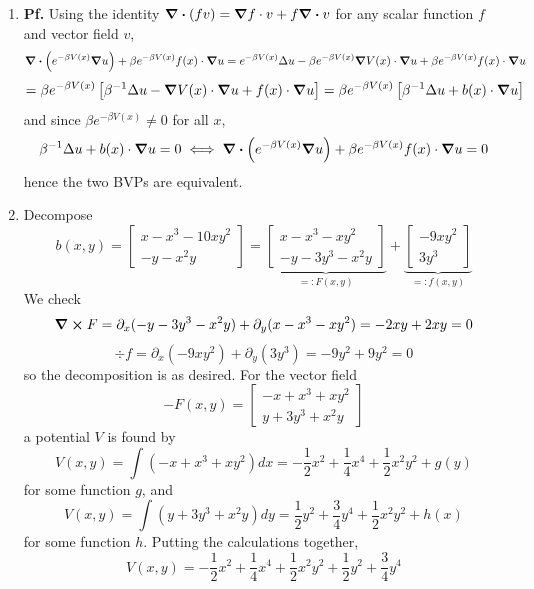 \documentclass{article}
\def\tbf#1{\textbf{#1}}
\newcommand{\sbr}[1]{\left[#1\right]}
\newcommand{\m}[2][b]{\begin{#1matrix}#2\end{#1matrix}}
\newcommand{\inv}{^{-1}}
\newcommand{\pf}{\tbf{Pf. }}
\newcommand{\ptl}{\partial}
\begin{document}
\begin{enumerate}[label=(\alph*)]
	
\item \pf Using the identity $\div(fv)=\grad f\cdot v+f\div v$ for any scalar function $f$ and vector field $v$,
$$\div(e^{-\beta V(x)}\grad u) + \beta e^{-\beta V(x)}f(x)\cdot\grad u
= e^{-\beta V(x)}\Delta u - \beta e^{-\beta V(x)}\grad V(x)\cdot\grad u + \beta e^{-\beta V(x)}f(x)\cdot\grad u$$
$$= \beta e^{-\beta V(x)}\sbr{\beta\inv\Delta u - \grad V(x)\cdot\grad u + f(x)\cdot\grad u}
= \beta e^{-\beta V(x)}\sbr{\beta\inv\Delta u + b(x)\cdot\grad u}$$
and since $\beta e^{-\beta V(x)}\ne0$ for all $x$,
$$\beta\inv\Delta u + b(x)\cdot\grad u = 0
\iff \div(e^{-\beta V(x)}\grad u) + \beta e^{-\beta V(x)}f(x)\cdot\grad u = 0$$
hence the two BVPs are equivalent.


\item Decompose
$$b(x,y) = \m{x-x^3-10xy^2 \\ -y-x^2y}
= \underbrace{\m{x-x^3-xy^2 \\ -y-3y^3-x^2y}}_{=:F(x,y)} + \underbrace{\m{-9xy^2 \\ 3y^3}}_{=:f(x,y)}$$
We check
$$\curl F = \ptl_x(-y-3y^3-x^2y) + \ptl_y(x-x^3-xy^2) = -2xy + 2xy = 0$$
$$\div f = \ptl_x(-9xy^2) + \ptl_y(3y^3) = -9y^2 + 9y^2 = 0$$
so the decomposition is as desired. For the vector field
$$-F(x,y) = \m{-x+x^3+xy^2 \\ y+3y^3+x^2y}$$
a potential $V$ is found by
$$V(x,y) = \int (-x+x^3+xy^2)dx = -\frac12x^2 + \frac14x^4 + \frac12x^2y^2 + g(y)$$
for some function $g$, and
$$V(x,y) = \int (y+3y^3+x^2y)dy = \frac12y^2 + \frac34y^4 + \frac12x^2y^2 + h(x)$$
for some function $h$. Putting the calculations together,
$$V(x,y) = -\frac12x^2 + \frac14x^4 + \frac12x^2y^2 + \frac12y^2 + \frac34y^4$$

 
\end{enumerate}

	
\end{document}

